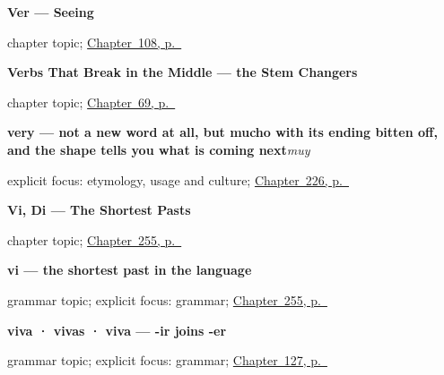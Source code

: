\noindent\begin{minipage}[t]{\linewidth}
\raggedright
\textbf{Ver --- Seeing}\par
\footnotesize chapter topic; \hyperref[ch:spanish-ver]{Chapter~108, p.~\pageref*{ch:spanish-ver}}
\end{minipage}\par\smallskip

\noindent\begin{minipage}[t]{\linewidth}
\raggedright
\textbf{Verbs That Break in the Middle --- the Stem Changers}\par
\footnotesize chapter topic; \hyperref[ch:stem-changes]{Chapter~69, p.~\pageref*{ch:stem-changes}}
\end{minipage}\par\smallskip

\noindent\begin{minipage}[t]{\linewidth}
\raggedright
\textbf{very — not a new word at all, but mucho with its ending bitten off, and the shape tells you what is coming next}\enspace\emph{muy}\par
\footnotesize explicit focus: etymology, usage and culture; \hyperref[ch:muy]{Chapter~226, p.~\pageref*{ch:muy}}
\end{minipage}\par\smallskip

\noindent\begin{minipage}[t]{\linewidth}
\raggedright
\textbf{Vi, Di --- The Shortest Pasts}\par
\footnotesize chapter topic; \hyperref[ch:vi-di]{Chapter~255, p.~\pageref*{ch:vi-di}}
\end{minipage}\par\smallskip

\noindent\begin{minipage}[t]{\linewidth}
\raggedright
\textbf{vi — the shortest past in the language}\par
\footnotesize grammar topic; explicit focus: grammar; \hyperref[ch:vi-di]{Chapter~255, p.~\pageref*{ch:vi-di}}
\end{minipage}\par\smallskip

\noindent\begin{minipage}[t]{\linewidth}
\raggedright
\textbf{viva · vivas · viva — -ir joins -er}\par
\footnotesize grammar topic; explicit focus: grammar; \hyperref[ch:spanish-subjuntivo-regular]{Chapter~127, p.~\pageref*{ch:spanish-subjuntivo-regular}}
\end{minipage}\par\smallskip

